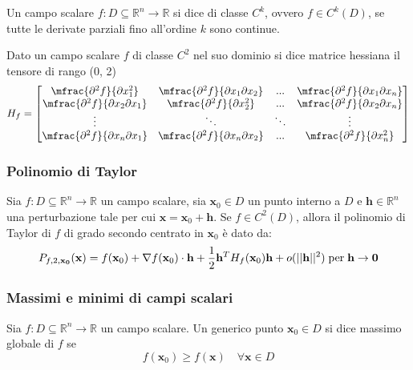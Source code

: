             \begin{definition}
                Un campo scalare $f: D \subseteq \mathbb{R}^{n} \rightarrow \mathbb{R}$ si dice di classe $C^{k}$, ovvero $f \in C^{k}(D)$, se tutte le derivate parziali fino all'ordine $k$ sono continue.
            \end{definition}

            Dato un campo scalare $f$ di classe $C^{2}$ nel suo dominio si dice matrice hessiana il tensore di rango (0, 2)
            \[
                H_{f} =
                \begin{bmatrix}
                    \mfrac{\partial^{2} f}{\partial x_1^{2}} & \mfrac{\partial^{2} f}{\partial x_1 \partial x_2} & ... & \mfrac{\partial^{2} f}{\partial x_1 \partial x_n} \\
                    \mfrac{\partial^{2} f}{\partial x_2 \partial x_1} & \mfrac{\partial^{2} f}{\partial x_2^{2}} & ... & \mfrac{\partial^{2} f}{\partial x_2 \partial x_n} \\
                    \vdots & \ddots & \ddots & \vdots \\
                    \mfrac{\partial^{2} f}{\partial x_n \partial x_1} & \mfrac{\partial^{2} f}{\partial x_n \partial x_2} & ... & \mfrac{\partial^{2} f}{\partial x_n^{2}} \\
                \end{bmatrix}
            \]

        \subsubsection{Polinomio di Taylor}
            Sia $f: D \subseteq \mathbb{R}^{n} \rightarrow \mathbb{R}$ un campo scalare, sia $\mathbf{x}_0 \in D$ un punto interno a $D$ e $\mathbf{h} \in \mathbb{R}^{n}$ una perturbazione
            tale per cui $\mathbf{x} = \mathbf{x}_0 + \mathbf{h}$. Se $f \in C^{2}(D)$, allora il polinomio di Taylor di $f$ di grado secondo centrato in $\mathbf{x}_0$ è dato da:
            \[
                P_{f, 2, \mathbf{x_0}} (\mathbf{x}) = f(\mathbf{x}_0) + \nabla f(\mathbf{x}_0) \cdot \mathbf{h} + \frac{1}{2} \mathbf{h}^{T} H_{f}(\mathbf{x}_0) \mathbf{h} + o(||\mathbf{h}||^{2}) \; \textnormal{per} \; \mathbf{h} \rightarrow \mathbf{0}
            \]

        \subsubsection{Massimi e minimi di campi scalari}
            \begin{definition}
                Sia $f: D \subseteq \mathbb{R}^{n} \rightarrow \mathbb{R}$ un campo scalare. Un generico punto $\mathbf{x}_0 \in D$ si dice massimo globale di $f$ se
                \[
                    f(\mathbf{x}_0) \geq f(\mathbf{x}) \quad \forall \mathbf{x} \in D
                \]
            \end{definition}

